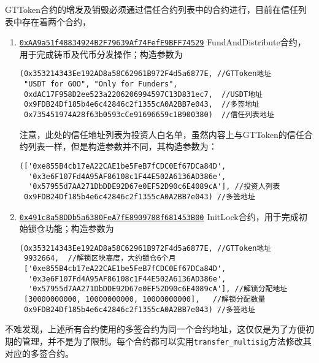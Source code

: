 \documentclass[12pt]{article}
\newcommand{\ethaddr}[1]{{\href{https://etherscan.io/address/#1}{\texttt{#1}}}}
\begin{document}
GTToken合约的增发及销毁必须通过信任合约列表中的合约进行，目前在信任列表中存在着两个合约，
\begin{enumerate}
\item \ethaddr{0xAA9a51f48834924B2F79639Af74FefE9BFF74529} FundAndDistribute合约，用于完成铸币及代币分发操作；构造参数为
\begin{verbatim}
(0x353214343Ee192AD8a58C62961B972F4d5a6877E, //GTToken地址
 "USDT for GOO", "Only for Funders", 
 0xdAC17F958D2ee523a2206206994597C13D831ec7,  //USDT地址  
 0x9FDB24Df185b4e6c42846c2f1355cA0A2BB7e043,  //多签地址
 0x735451974A28f63b0593cCe91696659c1B900380)  //信任列表地址
\end{verbatim}
注意，此处的信任地址列表为投资人白名单，虽然内容上与GTToken的信任合约列表一样，但是构造参数并不同，其构造参数为：
\begin{verbatim}
(['0xe855B4cb17eA22CAE1be5FeB7fCDC0Ef67DCa84D',
  '0x3e6F107Fd4A95AF86108c1F44E502A6136AD386e',
  '0x57955d7AA271DbDDE92D67e0EF52D90c6E4089cA'], //投资人列表
 0x9FDB24Df185b4e6c42846c2f1355cA0A2BB7e043) //多签地址
\end{verbatim}

\item \ethaddr{0x491c8a58DDb5a6380FeA7fE8909788f681453B00} InitLock合约，用于完成初始锁仓功能；构造参数为
\begin{verbatim}
(0x353214343Ee192AD8a58C62961B972F4d5a6877E, //GTToken地址
 9932664,  //解锁区块高度，大约锁仓6个月
 ['0xe855B4cb17eA22CAE1be5FeB7fCDC0Ef67DCa84D',
  '0x3e6F107Fd4A95AF86108c1F44E502A6136AD386e',
  '0x57955d7AA271DbDDE92D67e0EF52D90c6E4089cA'], //解锁分配地址
 [30000000000, 10000000000, 10000000000],   //解锁分配数量
 0x9FDB24Df185b4e6c42846c2f1355cA0A2BB7e043) //多签地址
\end{verbatim}
\end{enumerate}

不难发现，上述所有合约使用的多签合约为同一个合约地址，这仅仅是为了方便初期的管理，并不是为了限制。每个合约都可以实用\texttt{transfer\_multisig}方法修改其对应的多签合约。

\newpage
\begin{appendices}
%
%
\end{appendices}
\end{document}
